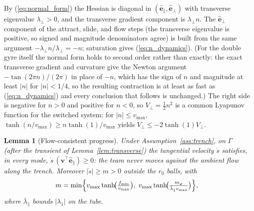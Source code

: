 \documentclass[lettersize,journal]{IEEEtran}
\newtheorem{lemma}{Lemma}
\begin{document}
\begin{IEEEproof}
By (\ref{eq:normal_form}) the Hessian is diagonal in
$(\hat{\mathbf{e}}_\parallel, \hat{\mathbf{e}}_\perp)$ with
transverse eigenvalue $\lambda_\perp > 0$, and the transverse gradient
component is $\lambda_\perp n$. The $\hat{\mathbf{e}}_\perp$
component of the attract, slide, and flow steps (the transverse
eigenvalue is positive, so signed and magnitude denominators agree) is
built from the same argument $-\lambda_\perp n / \lambda_\perp = -n$;
saturation gives (\ref{eq:n_dynamics}). (For the double gyre itself the
normal form holds to second order rather than exactly: the exact
transverse gradient and curvature give the Newton argument
$-\tan(2\pi n)/(2\pi)$ in place of $-n$, which has the sign of $n$ and
magnitude at least $|n|$ for $|n| < 1/4$, so the resulting contraction
is at least as fast as (\ref{eq:n_dynamics}) and every conclusion that
follows is unchanged.) The right side is negative for $n > 0$ and
positive for $n < 0$, so $V_\perp = \tfrac{1}{2}n^2$ is a common
Lyapunov function for the switched system; for $|n| \leq v_{\max}$,
$\tanh(n/v_{\max}) \geq n \tanh(1)/v_{\max}$ yields $\dot{V}_\perp \leq
-2\tanh(1) V_\perp$.
\end{IEEEproof}

\begin{lemma}[Flow-consistent progress]
\label{lem:progress}
Under Assumption~\ref{ass:trench}, on $\Gamma$ (after the transient of
Lemma~\ref{lem:transverse}) the tangential velocity $\dot{s}$
satisfies, in every mode, $\dot{s}\,(\mathbf{v}^\top
\hat{\mathbf{e}}_\parallel) \geq 0$: the team never moves against the
ambient flow along the trench. Moreover $|\dot{s}| \geq m > 0$ outside
the $r_0$ balls, with
\begin{equation}
    m = \min\Bigl\{
    v_{\max}\tanh\!\bigl(\tfrac{f_{\min}}{v_{\max}}\bigr),\;
    v_{\max}\tanh\!\bigl(\tfrac{m_\varphi}
    {\bar{\lambda}_\parallel v_{\max}}\bigr)
    \Bigr\},
    \label{eq:progress_rate}
\end{equation}
where $\bar{\lambda}_\parallel$ bounds $|\lambda_1|$ on the tube.
\end{lemma}
\end{document}
